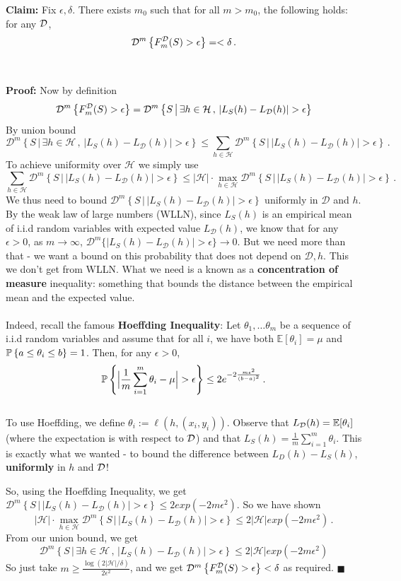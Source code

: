 \documentclass[11pt]{article}
\newcommand{\Dc}{\mathcal{D}}
\newcommand{\Hc}{\mathcal{H}}
\begin{document}
{\bf Claim:} Fix $\epsilon,\delta$. There exists $m_0$ such that for all
$m>m_0$, the following holds: for any $\mathcal{D}$,
\[
  \D^m\left\{ F_m^\Dc(S)>\epsilon \right\} =  
  <\delta\,.
\]
\\~\\
{\bf Proof:}
Now by definition
\[
  \D^m\left\{ F_m^\Dc(S)>\epsilon \right\} =  
  \Dc^m\left\{ S\,\big|\, \exists h\in\Hc\,,\,|L_S(h)-L_\Dc(h)|>\epsilon
    \right\}
\]
By union bound
\[
\Dc^m\left\{ S\,\big|\, \exists h\in\Hc\,,\,|L_S(h)-L_\Dc(h)|>\epsilon
    \right\}
    \leq 
    \sum_{h\in\Hc} \Dc^m\left\{ S\,\big|\,|L_S(h)-L_\Dc(h)|>\epsilon
        \right\}\,.
\]
To achieve uniformity over $\Hc$ we simply use
\[
    \sum_{h\in\Hc} \Dc^m\left\{ S\,\big|\,|L_S(h)-L_\Dc(h)|>\epsilon
        \right\}
        \leq 
        |\Hc|\cdot \max_{h\in\Hc} 
        \Dc^m\left\{ S\,\big|\,|L_S(h)-L_\Dc(h)|>\epsilon
        \right\}\,.
\]
We thus need to bound 
$ \Dc^m\left\{ S\,\big|\,|L_S(h)-L_\Dc(h)|>\epsilon
\right\}$ uniformly in $\Dc$ and $h$. By the weak law of large numbers (WLLN), since $L_S(h)$ is an empirical
mean of i.i.d random variables with expected value $L_\Dc(h)$, we know that 
for any $\epsilon>0$, 
as $m\to\infty$, $\Dc^m\{\big|L_S(h) - L_\Dc(h)\big|>\epsilon\}\to 0$. But we need more than that - we want a
bound on this probability that does not depend on $\Dc,h$.
This we don't get from WLLN. 
What we need is a known as a {\bf concentration of measure} inequality:
  something that bounds the distance between the empirical mean and the expected
  value. 
\\~\\Indeed, recall the
famous {\bf Hoeffding Inequality}: Let $\theta_1,\ldots\theta_m$ be a sequence
of i.i.d random variables and assume that for all $i$,
we have both $\mathbb{E}[\theta_i]=\mu$ and $\operatorname*{\mathbb{P}}\left\{ a\leq \theta_i\leq b
\right\}=1$. Then, for any $\epsilon>0$,
\[
  \prob\left\{ \Big| \frac{1}{m}\sum_{i=1}^m\theta_i - \mu \Big|>\epsilon \right\} \leq
  2 e^{ -2\frac{m\epsilon^2}{(b-a)^2} }\,.
\]
~\\ To use Hoeffding, we define
$\theta_i := \ell(h,(x_i,y_i))$. 
Observe that $L_{\mathcal{D}}(h) = \mathbb{E}[\theta_i]$ (where the expectation is with
respect to $\mathcal{D}$) and that $L_S(h) = \frac{1}{m}\sum_{i=1}^m \theta_i$.
This is exactly what we wanted - to bound the difference between
$L_D(h)-L_S(h)$, {\bf uniformly} in $h$ and $\mathcal{D}$!

So, using the Hoeffding Inequality, we get
$ \Dc^m\left\{ S\,\big|\,|L_S(h)-L_\Dc(h)|>\epsilon
\right\} \leq 2exp(-2m\epsilon^2)$.
So we have shown
\[
  |\Hc|\cdot \max_{h\in\Hc} 
        \Dc^m\left\{ S\,\big|\,|L_S(h)-L_\Dc(h)|>\epsilon
        \right\} \leq 2|\Hc| exp(-2m\epsilon^2)\,.
\]
From our union bound, we get 
\[
  \Dc^m\left\{ S\,\big|\, \exists h\in\Hc\,,\,|L_S(h)-L_\Dc(h)|>\epsilon
    \right\}
    \leq 2|\Hc| exp(-2m\epsilon^2)
\]
So just take $m\geq \frac{\log\left( 2|\Hc|/\delta \right)}{2\epsilon^2}$, and
we get  $\D^m\left\{ F_m^\Dc(S)>\epsilon \right\} <\delta$ as required.
 $\blacksquare$
\end{document}
